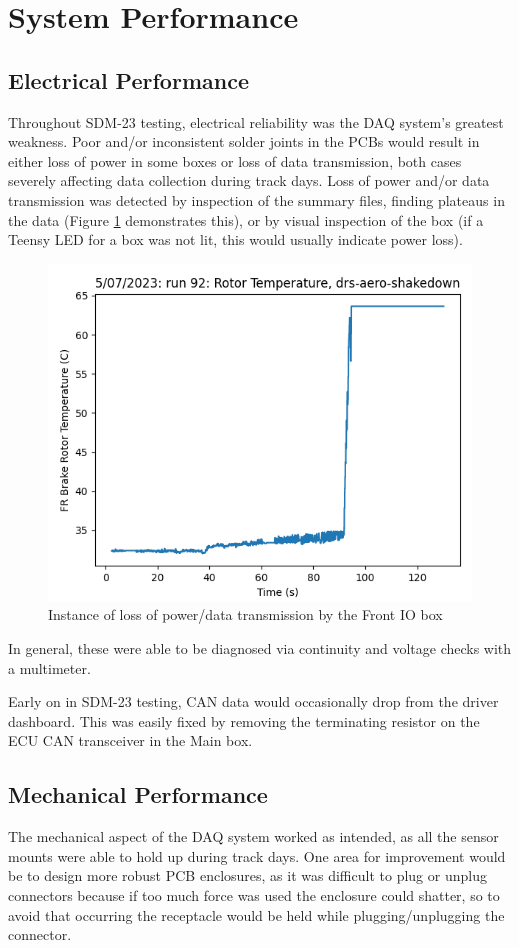 \section{System Performance}
\subsection{Electrical Performance}
Throughout SDM-23 testing, electrical reliability was the DAQ system's greatest weakness.
Poor and/or inconsistent solder joints in the PCBs would result in either loss of power in some boxes or loss of data transmission, both cases severely affecting data collection during track days.
Loss of power and/or data transmission was detected by inspection of the summary files, finding plateaus in the data (Figure \ref{fig:los} demonstrates this), or by visual inspection of the box (if a Teensy LED for a box was not lit, this would usually indicate power loss).
\begin{figure}[H]
    \centering
    \includegraphics[width=4.5in]{images/data-loss.png}
    \caption{Instance of loss of power/data transmission by the Front IO box}
    \label{fig:los}
\end{figure}
In general, these were able to be diagnosed via continuity and voltage checks with a multimeter.
\vspace{1em}

Early on in SDM-23 testing, CAN data would occasionally drop from the driver dashboard.
This was easily fixed by removing the terminating resistor on the ECU CAN transceiver in the Main box.

\subsection{Mechanical Performance}
The mechanical aspect of the DAQ system worked as intended, as all the sensor mounts were able to hold up during track days.
One area for improvement would be to design more robust PCB enclosures, as it was difficult to plug or unplug connectors because if too much force was used the enclosure could shatter, so to avoid that occurring the receptacle would be held while plugging/unplugging the connector.

